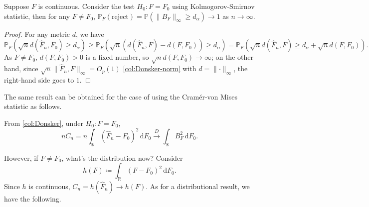 \begin{proposition}\label{prop:Kolmogorov-Smirnov}
	Suppose \(F\) is continuous. Consider the test \(H_0 \colon F = F_0\) using Kolmogorov-Smirnov statistic, then for any \(F \neq F_0\), \(\mathbb{P} _F(\text{reject} ) = \mathbb{P} (\lVert B_F \rVert _\infty \geq d_\alpha ) \to 1\) as \(n \to \infty \).
\end{proposition}
\begin{proof}
	For any metric \(d\), we have
	\[
		\mathbb{P} _F (\sqrt{n} d(\hat{F} _n, F_0) \geq d_\alpha )
		\geq \mathbb{P} _F(\sqrt{n} (d(\hat{F} _n, F) - d(F, F_0))\geq d_\alpha )
		= \mathbb{P} _F(\sqrt{n} d(\hat{F} _n, F) \geq d_\alpha + \sqrt{n} d(F, F_0)).
	\]
	As \(F \neq F_0\), \(d(F, F_0) > 0\) is a fixed number, so \(\sqrt{n} d(F, F_0) \to \infty \); on the other hand, since \(\sqrt{n} \lVert \hat{F} _n, F  \rVert _\infty = O_p(1)\) \autoref{col:Donsker-norm} with \(d = \lVert \cdot \rVert _\infty \), the right-hand side goes to \(1\).
\end{proof}

The same result can be obtained for the case of using the Cramér-von Mises statistic as follows.

\begin{prev}
	From \autoref{col:Donsker}, under \(H_0 \colon F = F_0\),
	\[
		n C_n
		= n \int _\mathbb{R} (\hat{F} _n - F_0)^2 \,\mathrm{d} F_0
		\overset{D}{\to } \int _\mathbb{R} B_F^2 \,\mathrm{d} F_0.
	\]
\end{prev}

However, if \(F \neq F_0\), what's the distribution now? Consider
\[
	h(F) \coloneqq \int _\mathbb{R} (F - F_0)^2 \,\mathrm{d} F_0.
\]
Since \(h\) is continuous, \(C_n = h(\hat{F} _n) \to h(F) \). As for a distributional result, we have the following.

